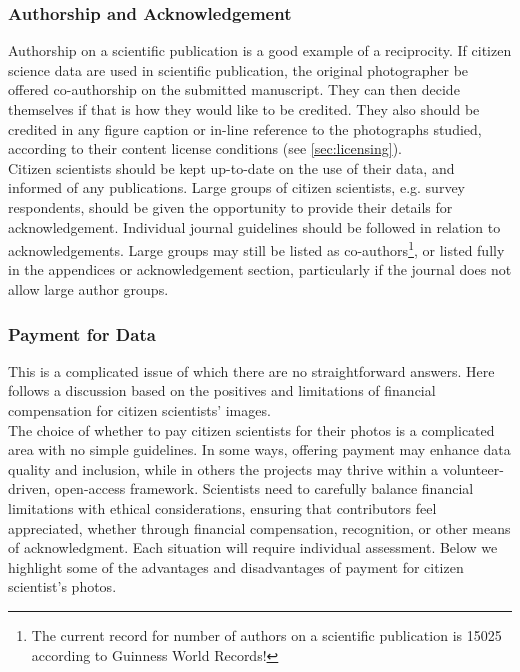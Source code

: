 \documentclass{article}
\newcommand{\contributed}[1]{%
    \par\noindent
    \begingroup
    \setlength{\leftskip}{1em}%
    \itshape
    Contributors: #1
    \par
    \endgroup
    \vspace{0.5em}
}
\begin{document}
\subsubsection{Authorship and Acknowledgement}\label{sec:authorship}
Authorship on a scientific publication is a good example of a reciprocity. If citizen science data are used in scientific publication, the original photographer be offered co-authorship on the submitted manuscript. They can then decide themselves if that is how they would like to be credited. They also should be credited in any figure caption or in-line reference to the photographs studied, according to their content license conditions (see \ref{sec:licensing}). \\ 

Citizen scientists should be kept up-to-date on the use of their data, and informed of any publications. Large groups of citizen scientists, e.g. survey respondents, should be given the opportunity to provide their details for acknowledgement. Individual journal guidelines should be followed in relation to acknowledgements. Large groups may still be listed as co-authors\footnote{The current record for number of authors on a scientific publication is 15025 according to Guinness World Records!}, or listed fully in the appendices or acknowledgement section, particularly if the journal does not allow large author groups. \\

\subsubsection{Payment for Data}\label{sec:payment}


This is a complicated issue of which there are no straightforward answers. Here follows a discussion based on the positives and limitations of financial compensation for citizen scientists' images.\\

The choice of whether to pay citizen scientists for their photos is a complicated area with no simple guidelines. In some ways, offering payment may enhance data quality and inclusion, while in others the projects may thrive within a volunteer-driven, open-access framework. Scientists need to carefully balance financial limitations with ethical considerations, ensuring that contributors feel appreciated, whether through financial compensation, recognition, or other means of acknowledgment. Each situation will require individual assessment. Below we highlight some of the advantages and disadvantages of payment for citizen scientist's photos.\\
\end{document}
